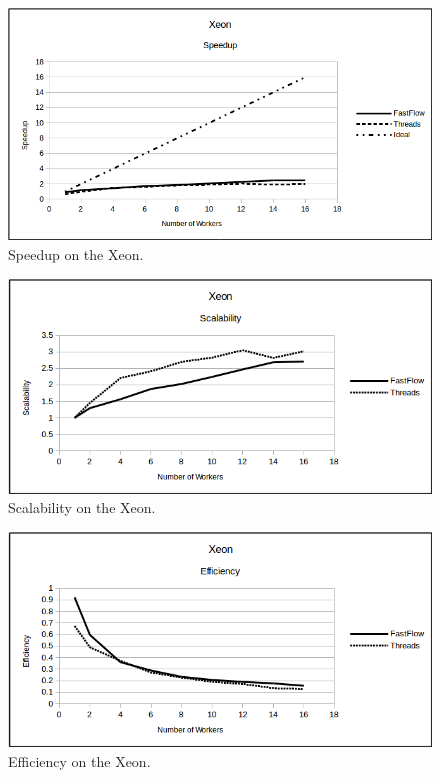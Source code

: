 \documentclass[10pt]{article}
\numberwithin{equation}{section}
\begin{document}
\begin{figure} 
	\centering
	\includegraphics[scale=.75]{Xeon_Speedup.png}
	\caption{Speedup on the Xeon.}
	\label{fig:xeonspeedup}
\end{figure}

\begin{figure} 
\centering
\includegraphics[scale=.75]{Xeon_Scalability.png}
\caption{Scalability on the Xeon.}
\label{fig:xeonscalability}
\end{figure}

\begin{figure} 
\centering
\includegraphics[scale=.75]{Xeon_Efficiency.png}
\caption{Efficiency on the Xeon.}
\label{fig:xeonefficiency}
\end{figure}
\end{document}
